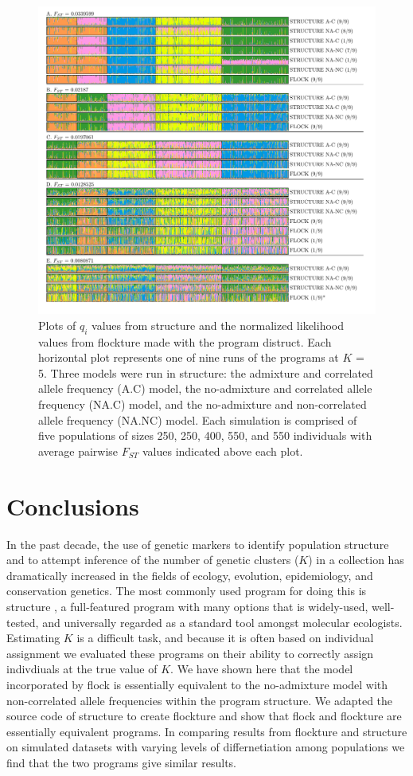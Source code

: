  \begin{figure}
\centering
  \includegraphics[width=.8\linewidth]{images/Figures-Pat/FlockturevStructureDistruct.pdf}%
  \caption{Plots of $q_i$ values from {\sc structure} and the normalized likelihood values from
  {\sc flockture} made with the program {\sc distruct}. Each horizontal plot represents one of nine 
 runs of the programs  at $K$ = 5. Three models were run in structure: the admixture and correlated allele 
  frequency (A.C) model, 
the no-admixture and correlated allele frequency (NA.C) model, 
and the no-admixture and non-correlated allele frequency (NA.NC) model. Each simulation is comprised of
 five populations of sizes 250, 250, 400, 550, and 550 individuals with average pairwise $F_{ST}$ values
 indicated above each plot.}
  \label{fig:FvSdistruct}
\end{figure}

\section*{Conclusions}
In the past decade, the use of genetic markers to identify population structure and to attempt inference of
the number of genetic clusters ($K$) in a collection has dramatically increased in the fields of ecology, evolution, 
epidemiology, and conservation
genetics. The most commonly used program for doing this is {\sc structure} \citep{Pritchardetal2000,Falushetal2003}, 
a full-featured program with many options that is widely-used, well-tested, and universally regarded as a standard tool amongst molecular ecologists. 
Estimating $K$ is a difficult task, and because it is often based on individual assignment we 
evaluated these programs on their ability to correctly assign indivdiuals at the true value
of $K$. We have shown here that the model incorporated by {\sc flock} is essentially equivalent to the no-admixture model 
with non-correlated allele frequencies within the program {\sc structure}. 
We adapted the source code of {\sc structure} to create {\sc flockture} and show that
 {\sc flock} and {\sc flockture} are essentially equivalent programs. 
In comparing results from {\sc flockture} and {\sc structure} 
on simulated datasets with varying levels of differnetiation among populations
we find that the two programs give similar results.

